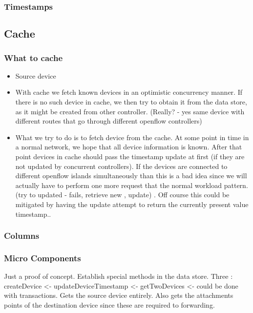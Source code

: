 \subsubsection{Timestamps}
\subsection{Cache}

\subsubsection{What to cache}
\begin{itemize}
\item Source device 

\item With cache we fetch known devices in an optimistic concurrency
manner.  If there is no such device in cache, we then try to obtain it
from the data store, as it might be created from other
controller. (Really? - yes same device with different routes that go
through different openflow controllers)

\item What we try to do is to fetch device from the cache. At some point in
time in a  normal network, we hope that all device information is
known. After that point devices in cache should pass the timestamp
update at first (if they are not updated by concurrent
controllers). If the devices are connected to different openflow
islands simultaneously than this is a bad idea since we will actually
have to perform one more request that the normal workload
pattern. (try to updated - fails, retrieve new , update) . Off course
this could be mitigated by having the update attempt to return the
currently present value timestamp..
\end{itemize}




\subsubsection{Columns}


\subsubsection{Micro Components}
Just a proof of concept. Establish special methods in the data store. 
Three : 
createDevice <-
updateDeviceTimestamp <- 
getTwoDevices <- could be done with transactions.  Gets the source
device entirely. Also gets the attachments points of the destination
device since these are required to forwarding. 

